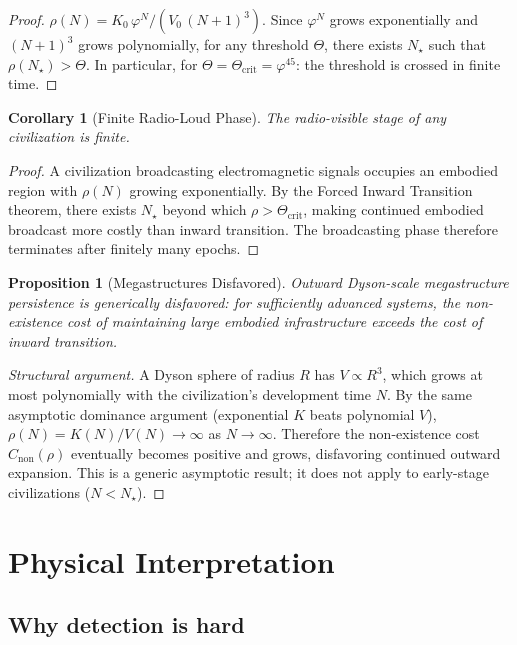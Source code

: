 \documentclass[12pt,a4paper]{article}
\newtheorem{corollary}[theorem]{Corollary}
\newtheorem{proposition}[theorem]{Proposition}
\theoremstyle{definition}
\theoremstyle{remark}
\begin{document}
\begin{proof}
$\rho(N) = K_0\,\varphi^N / (V_0\,(N+1)^3)$.  Since $\varphi^N$
grows exponentially and $(N+1)^3$ grows polynomially, for any
threshold $\Theta$, there exists $N_\star$ such that
$\rho(N_\star) > \Theta$.  In particular, for
$\Theta = \Theta_{\mathrm{crit}} = \varphi^{45}$: the threshold
is crossed in finite time.
\end{proof}

\begin{corollary}[Finite Radio-Loud Phase]
The radio-visible stage of any civilization is finite.
\end{corollary}

\begin{proof}
A civilization broadcasting electromagnetic signals occupies an
embodied region with $\rho(N)$ growing exponentially.  By the
Forced Inward Transition theorem, there exists $N_\star$ beyond
which $\rho > \Theta_{\mathrm{crit}}$, making continued embodied
broadcast more costly than inward transition.  The broadcasting
phase therefore terminates after finitely many epochs.
\end{proof}

\begin{proposition}[Megastructures Disfavored]
Outward Dyson-scale megastructure persistence is generically
disfavored: for sufficiently advanced systems, the non-existence
cost of maintaining large embodied infrastructure exceeds the
cost of inward transition.
\end{proposition}

\begin{proof}[Structural argument]
A Dyson sphere of radius $R$ has $V \propto R^3$, which grows at
most polynomially with the civilization's development time $N$.
By the same asymptotic dominance argument (exponential $K$ beats
polynomial $V$), $\rho(N) = K(N)/V(N) \to \infty$ as $N \to
\infty$.  Therefore the non-existence cost $C_{\mathrm{non}}(\rho)$
eventually becomes positive and grows, disfavoring continued
outward expansion.  This is a generic asymptotic result; it does
not apply to early-stage civilizations ($N < N_\star$).
\end{proof}

\section{Physical Interpretation}
\label{sec:interpretation}

\subsection{Why detection is hard}
\end{document}
